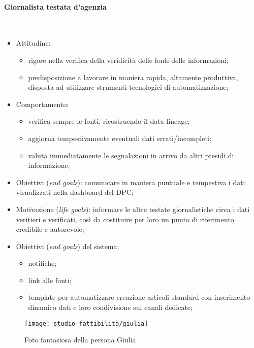 \paragraph{Giornalista testata d'agenzia}\mbox{}\\
\begin{itemize}
	\item Attitudine:
    \begin{itemize}
        \item rigore nella verifica della veridicità delle fonti delle informazioni;
        \item predisposizione a lavorare in maniera rapida, altamente produttiva, disposta ad utilizzare strumenti tecnologici di automatizzazione;
    \end{itemize}
    \item Comportamento: 
    \begin{itemize}
        \item verifica sempre le fonti, ricostruendo il data lineage;
        \item aggiorna tempestivamente eventuali dati errati/incompleti;
        \item valuta immediatamente le segnalazioni in arrivo da altri presidi di informazione;
    \end{itemize}
    \item Obiettivi (\textit{end goals}): comunicare in maniera puntuale e tempestiva i dati visualizzati nella dashboard del DPC;
    \item Motivazione (\textit{life goals}): informare le altre testate giornalistiche circa i dati veritieri e verificati, così da costituire per loro un punto di riferimento credibile e autorevole;
    \item Obiettivi (\textit{end goals}) del sistema:
    \begin{itemize}
        \item notifiche;
        \item link alle fonti;
        \item template per automatizzare creazione articoli standard con inserimento dinamico dati e loro condivisione sui canali dedicate;
    \end{itemize}
\end{itemize}

\begin{wrapfigure}{r}{7cm}
    \texttt{[image: studio-fattibilità/giulia]}
    \caption{Foto fantasiosa della persona Giulia}
\end{wrapfigure}


